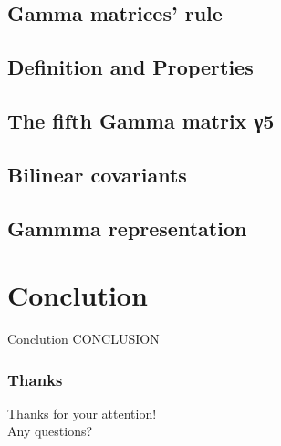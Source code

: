 \documentclass[serif,11pt]{beamer}
\begin{document}
\subsection{Gamma matrices’ rule}

\subsection{Definition and Properties}

\subsection{The fifth Gamma matrix γ5}

\subsection{Bilinear covariants}

\subsection{Gammma representation}

\section{Conclution}
\begin{frame}{Conclution}
CONCLUSION
\end{frame}




\begin{frame}\frametitle{Thanks}
\centering

Thanks for your attention!\\
Any questions?
\end{frame}



\end{document}
